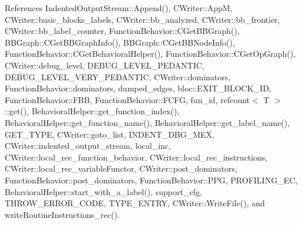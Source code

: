 References Indented\+Output\+Stream\+::\+Append(), C\+Writer\+::\+AppM, C\+Writer\+::basic\+\_\+blocks\+\_\+labels, C\+Writer\+::bb\+\_\+analyzed, C\+Writer\+::bb\+\_\+frontier, C\+Writer\+::bb\+\_\+label\+\_\+counter, Function\+Behavior\+::\+C\+Get\+B\+B\+Graph(), B\+B\+Graph\+::\+C\+Get\+B\+B\+Graph\+Info(), B\+B\+Graph\+::\+C\+Get\+B\+B\+Node\+Info(), Function\+Behavior\+::\+C\+Get\+Behavioral\+Helper(), Function\+Behavior\+::\+C\+Get\+Op\+Graph(), C\+Writer\+::debug\+\_\+level, D\+E\+B\+U\+G\+\_\+\+L\+E\+V\+E\+L\+\_\+\+P\+E\+D\+A\+N\+T\+IC, D\+E\+B\+U\+G\+\_\+\+L\+E\+V\+E\+L\+\_\+\+V\+E\+R\+Y\+\_\+\+P\+E\+D\+A\+N\+T\+IC, C\+Writer\+::dominators, Function\+Behavior\+::dominators, dumped\+\_\+edges, bloc\+::\+E\+X\+I\+T\+\_\+\+B\+L\+O\+C\+K\+\_\+\+ID, Function\+Behavior\+::\+F\+BB, Function\+Behavior\+::\+F\+C\+FG, fun\+\_\+id, refcount$<$ T $>$\+::get(), Behavioral\+Helper\+::get\+\_\+function\+\_\+index(), Behavioral\+Helper\+::get\+\_\+function\+\_\+name(), Behavioral\+Helper\+::get\+\_\+label\+\_\+name(), G\+E\+T\+\_\+\+T\+Y\+PE, C\+Writer\+::goto\+\_\+list, I\+N\+D\+E\+N\+T\+\_\+\+D\+B\+G\+\_\+\+M\+EX, C\+Writer\+::indented\+\_\+output\+\_\+stream, local\+\_\+inc, C\+Writer\+::local\+\_\+rec\+\_\+function\+\_\+behavior, C\+Writer\+::local\+\_\+rec\+\_\+instructions, C\+Writer\+::local\+\_\+rec\+\_\+variable\+Functor, C\+Writer\+::post\+\_\+dominators, Function\+Behavior\+::post\+\_\+dominators, Function\+Behavior\+::\+P\+PG, P\+R\+O\+F\+I\+L\+I\+N\+G\+\_\+\+EC, Behavioral\+Helper\+::start\+\_\+with\+\_\+a\+\_\+label(), support\+\_\+cfg, T\+H\+R\+O\+W\+\_\+\+E\+R\+R\+O\+R\+\_\+\+C\+O\+DE, T\+Y\+P\+E\+\_\+\+E\+N\+T\+RY, C\+Writer\+::\+Write\+File(), and write\+Routine\+Instructions\+\_\+rec().

